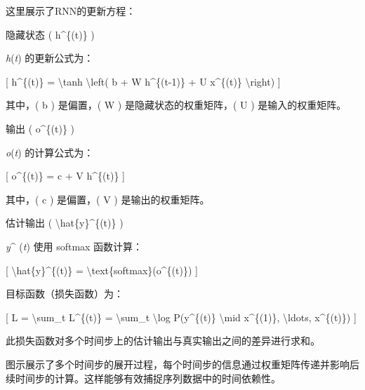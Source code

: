 
这里展示了RNN的更新方程：

隐藏状态 ( h\^{}\{(t)\} )

\emph{h}(\emph{t}) 的更新公式为：

{[} h\^{}\{(t)\} = \textbackslash tanh \textbackslash left( b + W
h\^{}\{(t-1)\} + U x\^{}\{(t)\} \textbackslash right) {]}


其中，( b ) 是偏置，( W ) 是隐藏状态的权重矩阵，( U ) 是输入的权重矩阵。

输出 ( o\^{}\{(t)\} )

\emph{o}(\emph{t}) 的计算公式为：

{[} o\^{}\{(t)\} = c + V h\^{}\{(t)\} {]}


其中，( c ) 是偏置，( V ) 是输出的权重矩阵。

估计输出 ( \textbackslash hat\{y\}\^{}\{(t)\} )

\emph{y}\^{} (\emph{t}) 使用 softmax 函数计算：

{[} \textbackslash hat\{y\}\^{}\{(t)\} =
\textbackslash text\{softmax\}(o\^{}\{(t)\}) {]}


目标函数（损失函数）为：

{[} L = \textbackslash sum\_t L\^{}\{(t)\} = \textbackslash sum\_t
\textbackslash log P(y\^{}\{(t)\} \textbackslash mid x\^{}\{(1)\},
\textbackslash ldots, x\^{}\{(t)\}) {]}


此损失函数对多个时间步上的估计输出与真实输出之间的差异进行求和。

图示展示了多个时间步的展开过程，每个时间步的信息通过权重矩阵传递并影响后续时间步的计算。这样能够有效捕捉序列数据中的时间依赖性。

